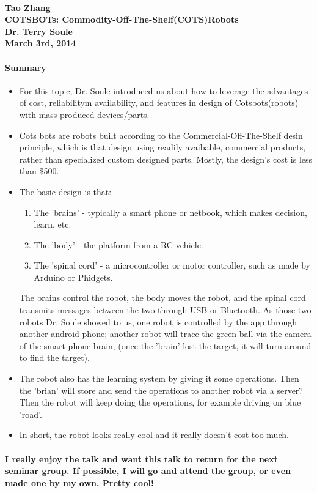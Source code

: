 \documentclass[12pt]{article}
\begin{document}
\paragraph{Tao Zhang\\COTSBOTs: Commodity-Off-The-Shelf(COTS)Robots\\Dr. Terry Soule\\March 3rd, 2014}

\paragraph{Summary}

\begin{itemize}
	\item For this topic, Dr. Soule introduced us about how to leverage the advantages of cost, reliabilitym availability, and features in design of Cotsbots(robots) with mass produced devices/parts.
	\item Cots bots are robots built according to the Commercial-Off-The-Shelf desin principle, which is that design using readily avaibable, commercial products, rather than specialized custom designed parts. Mostly, the design's cost is less than \$500. 
	\item The basic design is that:
	\begin{enumerate}
		\item The 'brains' - typically a smart phone or netbook, which makes decision, learn, etc.
		\item The 'body' - the platform from a RC vehicle.
		\item The 'spinal cord' - a microcontroller or motor controller, such as made by Arduino or Phidgets.
	\end{enumerate}
	The brains control the robot, the body moves the robot, and the spinal cord transmits messages between the two through USB or Bluetooth. As those two robots Dr. Soule showed to us, one robot is controlled by the app through another android phone; another robot will trace the green ball via the camera of the smart phone brain, (once the 'brain' lost the target, it will turn around to find the target). 
	\item The robot also has the learning system by giving it some operations. Then the 'brian' will store and send the operations to another robot via a server? Then the robot will keep doing the operations, for example driving on blue 'road'.
	\item In short, the robot looks really cool and it really doesn't cost too much. 
\end{itemize}

\paragraph{I really enjoy the talk and want this talk to return for the next seminar group. If possible, I will go and attend the group, or even made one by my own. Pretty cool!}
\end{document}
